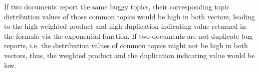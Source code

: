 If two documents report the same buggy topics, their corresponding
topic distribution values of those common topics would be high in both
vectors, leading to the high weighted product and high duplication
indicating value returned in the formula via the exponential function.
If two documents are not duplicate bug reports, i.e. the distribution
values of common topics might not be high in both vectors, thus, the
weighted product and the duplication indicating value would be low.







